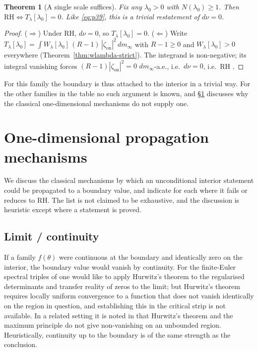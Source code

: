 \documentclass[11pt]{amsart}
\newtheorem{theorem}{Theorem}[section]
\theoremstyle{definition}
\theoremstyle{remark}
\newcommand{\RH}{\mathrm{RH}}
\newcommand{\dm}{dm_\infty}
\newcommand{\dnu}{d\nu}
\newcommand{\Wl}{W_\lambda}
\newcommand{\Tl}{T_\lambda}
\begin{document}
\begin{theorem}[A single scale suffices]\label{thm:single-scale}
Fix any $\lambda_0>0$ with $N(\lambda_0)\geq1$. Then $\RH\iff\Tl[\lambda_0]=0$. Like
\eqref{eq:p39}, this is a trivial restatement of $\dnu=0$.
\end{theorem}
\begin{proof}
($\Rightarrow$) Under RH, $\dnu=0$, so $\Tl[\lambda_0]=0$. ($\Leftarrow$)
Write $\Tl[\lambda_0]=\int \Wl[\lambda_0]\,(R-1)\,|\zeta_{\mathrm{on}}|^2\,\dm$
with $R-1\geq0$ \cite[Cor.~3.2]{P24} and $\Wl[\lambda_0]>0$ everywhere
(Theorem~\ref{thm:wlambda-strict}). The integrand is non-negative; its
integral vanishing forces $(R-1)|\zeta_{\mathrm{on}}|^2=0$ $\dm$-a.e., i.e.\ $\dnu=0$,
i.e.\ RH \cite[Cor.~3.2]{P24}.
\end{proof}

For this family the boundary is thus attached to the interior in a trivial way. For the other
families in the table no such argument is known, and \S\ref{sec:nogo} discusses why the
classical one-dimensional mechanisms do not supply one.

\section{One-dimensional propagation mechanisms}\label{sec:nogo}

We discuss the classical mechanisms by which an unconditional interior statement could be
propagated to a boundary value, and indicate for each where it fails or reduces to RH. The
list is not claimed to be exhaustive, and the discussion is heuristic except where a statement
is proved.

\subsection{Limit / continuity}\label{ssec:limit}
If a family $f(\theta)$ were continuous at the boundary and identically zero on the interior, the
boundary value would vanish by continuity. For the finite-Euler spectral triples of
\cite{CCM25} one would like to apply Hurwitz's theorem to the regularised determinants and
transfer reality of zeros to the limit; but Hurwitz's theorem requires locally uniform
convergence to a function that does not vanish identically on the region in question, and
establishing this in the critical strip is not available. In a related setting it is noted in
\cite[\S4]{P23} that Hurwitz's theorem and the maximum principle do not give non-vanishing on an
unbounded region. Heuristically, continuity up to the boundary is of the same strength as the
conclusion.
\end{document}
